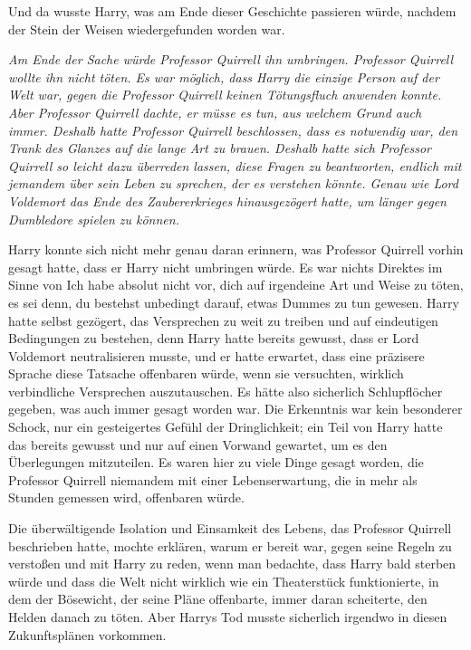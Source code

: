 Und da wusste Harry, was am Ende dieser Geschichte passieren würde, nachdem der
Stein der Weisen wiedergefunden worden war.

\emph{Am Ende der Sache würde Professor Quirrell ihn umbringen. Professor Quirrell wollte ihn nicht töten. Es war möglich, dass Harry die einzige Person auf der Welt war, gegen die Professor Quirrell keinen Tötungsfluch anwenden konnte. Aber Professor Quirrell dachte, er müsse es tun, aus welchem Grund auch immer. Deshalb hatte Professor Quirrell beschlossen, dass es notwendig war, den Trank des Glanzes auf die lange Art zu brauen. Deshalb hatte sich Professor Quirrell so leicht dazu überreden lassen, diese Fragen zu beantworten, endlich mit jemandem über sein Leben zu sprechen, der es verstehen könnte. Genau wie Lord Voldemort das Ende des Zaubererkrieges hinausgezögert hatte, um länger gegen Dumbledore spielen zu können.}

Harry konnte sich nicht mehr genau daran erinnern, was Professor Quirrell vorhin
gesagt hatte, dass er Harry nicht umbringen würde. Es war nichts Direktes im
Sinne von \glqq Ich habe absolut nicht vor, dich auf irgendeine Art und Weise zu
töten, es sei denn, du bestehst unbedingt darauf, etwas Dummes zu tun\grqq{}
gewesen. Harry hatte selbst gezögert, das Versprechen zu weit zu treiben und auf
eindeutigen Bedingungen zu bestehen, denn Harry hatte bereits gewusst, dass er
Lord Voldemort neutralisieren musste, und er hatte erwartet, dass eine präzisere
Sprache diese Tatsache offenbaren würde, wenn sie versuchten, wirklich
verbindliche Versprechen auszutauschen. Es hätte also sicherlich Schlupflöcher
gegeben, was auch immer gesagt worden war. Die Erkenntnis war kein besonderer
Schock, nur ein gesteigertes Gefühl der Dringlichkeit; ein Teil von Harry hatte
das bereits gewusst und nur auf einen Vorwand gewartet, um es den Überlegungen
mitzuteilen. Es waren hier zu viele Dinge gesagt worden, die Professor Quirrell
niemandem mit einer Lebenserwartung, die in mehr als Stunden gemessen wird,
offenbaren würde.

Die überwältigende Isolation und Einsamkeit des Lebens, das Professor Quirrell
beschrieben hatte, mochte erklären, warum er bereit war, gegen seine Regeln zu
verstoßen und mit Harry zu reden, wenn man bedachte, dass Harry bald sterben
würde und dass die Welt nicht wirklich wie ein Theaterstück funktionierte, in
dem der Bösewicht, der seine Pläne offenbarte, immer daran scheiterte, den
Helden danach zu töten. Aber Harrys Tod musste sicherlich irgendwo in diesen
Zukunftsplänen vorkommen.

